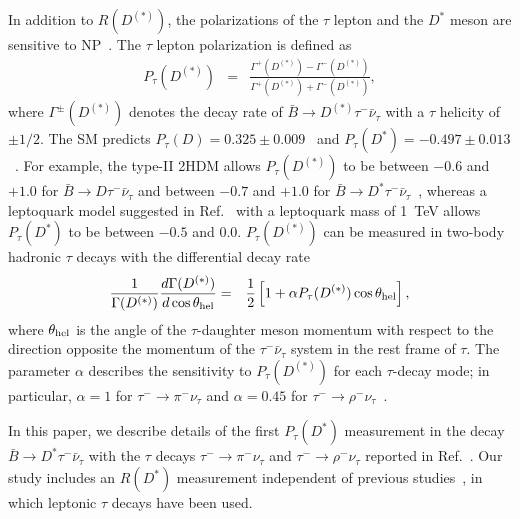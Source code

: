 \documentclass[aps,prd,twocolumn,superscriptaddress,showpacs,preprintnumbers,amsmath,amssymb]{revtex4-1}
\begin{document}
In addition to $R(D^{(*)})$, the polarizations of the $\tau$ lepton and the $D^*$ meson are sensitive to NP~\cite{cite:Tanaka:1995, cite:Tanaka:2010, cite:RDst:2012, cite:Datta:2012, cite:Biancofiore:2013, cite:Tanaka:2013, cite:Sakaki:2013, cite:Duraisamy:2014, cite:Bhattacharya:2016, cite:Bardhan:2017}. The $\tau$ lepton polarization is defined as
\begin{eqnarray}
  P_\tau(D^{(*)}) &=& \frac{\Gamma^+(D^{(*)}) - \Gamma^-(D^{(*)})}{\Gamma^+(D^{(*)}) + \Gamma^-(D^{(*)})},
\end{eqnarray}
where $\Gamma^{\pm}(D^{(*)})$ denotes the decay rate of $\bar{B} \rightarrow D^{(*)} \tau^- \bar{\nu}_\tau$ with a $\tau$ helicity of $\pm 1/2$. The SM predicts $P_\tau(D) = 0.325 \pm 0.009$~\cite{cite:Tanaka:2010} and $P_\tau(D^*) = -0.497 \pm 0.013$~\cite{cite:Tanaka:2013}. For example, the type-II 2HDM allows $P_\tau(D^{(*)})$ to be between $-0.6$ and $+1.0$ for $\bar{B} \rightarrow D \tau^- \bar{\nu}_\tau$ and between $-0.7$ and $+1.0$ for $\bar{B} \rightarrow D^* \tau^- \bar{\nu}_\tau$~\cite{cite:Tanaka:2013,cite:comment:2HDMII}, whereas a leptoquark model suggested in Ref.~\cite{cite:Sakaki:2013} with a leptoquark mass of 1~TeV allows $P_\tau(D^*)$ to be between $-0.5$ and $0.0$. $P_\tau(D^{(*)})$ can be measured in two-body hadronic $\tau$ decays with the differential decay rate
\begin{eqnarray}
  \frac{1}{\Gamma(D^{(*)})} \frac{d \Gamma(D^{(*)})}{d \cos\theta_{\rm hel}} &=& \frac{1}{2}\left[1 + \alpha P_\tau(D^{(*)}) \cos \theta_{\rm hel} \right],\label{eq:coshel}
\end{eqnarray}
where $\theta_{\rm hel}$ is the angle of the $\tau$-daughter meson momentum with respect to the direction opposite the momentum of the $\tau^- \bar{\nu}_\tau$ system in the rest frame of $\tau$. The parameter $\alpha$ describes the sensitivity to $P_\tau(D^{(*)})$ for each $\tau$-decay mode; in particular, $\alpha = 1$ for $\tau^- \rightarrow \pi^- \nu_\tau$ and $\alpha = 0.45$ for $\tau^- \rightarrow \rho^- \nu_{\tau}$~\cite{cite:Hagiwara:1990}.

In this paper, we describe details of the first $P_\tau(D^*)$ measurement in the decay $\bar{B} \rightarrow D^* \tau^- \bar{\nu}_\tau$ with the $\tau$ decays $\tau^- \rightarrow \pi^- \nu_{\tau}$ and $\tau^- \rightarrow \rho^- \nu_{\tau}$ reported in Ref.~\cite{cite:Belle:2017}. Our study includes an $R(D^*)$ measurement independent of previous studies~\cite{cite:Belle:2015, cite:Belle:2016, cite:BaBar:2012:letter, cite:BaBar:2013:fullpaper, cite:LHCb:2015}, in which leptonic $\tau$ decays have been used.
\end{document}
